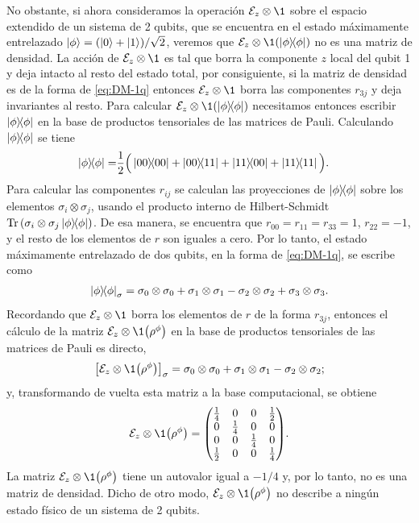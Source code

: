 No obstante, si ahora consideramos la operación $\E_z\otimes\1$ sobre el espacio extendido
de  un sistema de 2 qubits, que se encuentra en el estado máximamente
entrelazado $\ket{\phi}=\qty(\ket{0}+\ket{1})/\sqrt{2}$, veremos 
que $\E_z\otimes\1\qty(\dyad{\phi}{\phi})$  no es una matriz de densidad.
La acción de $\E_z\otimes\1$ es tal que borra la componente
$z$ local del qubit 1 y deja intacto al resto del estado total, por consiguiente,
si la matriz de densidad es de la forma de \eqref{eq:DM-1q} entonces 
$\E_z\otimes\1$ borra las componentes $r_{3j}$ y deja invariantes 
al resto. Para calcular $\E_z\otimes\1\qty(\dyad{\phi}{\phi})$
necesitamos entonces escribir $\dyad{\phi}{\phi}$ en la base
de productos tensoriales de las matrices de Pauli.
Calculando $\dyad{\phi}{\phi}$ se tiene
\begin{align}
\dyad{\phi}{\phi}=& 
\frac{1}{2}
\Big( \dyad{00}{00} + \dyad{00}{11}
+ \dyad{11}{00} + \dyad{11}{11} \Big).
\label{eq:DM-2q-MaxE}
\end{align}
Para calcular las componentes $r_{ij}$ se calculan las
proyecciones de $\dyad{\phi}{\phi}$ sobre
los elementos $\sigma_i\otimes\sigma_j$, usando el producto interno
de Hilbert-Schmidt $\Tr\qty(\pauli{i}{j}\dyad{\phi}{\phi})$.
De esa manera, se encuentra que $r_{00}=r_{11}=r_{33}=1$, $r_{22}=-1$,
y el resto de los elementos de $r$ son iguales a cero. 
Por lo tanto, el estado máximamente entrelazado de
dos qubits, en la forma de \eqref{eq:DM-1q}, se escribe como
\begin{align}
\dyad{\phi}{\phi}_{\sigma}=
\pauli{0}{0}+\pauli{1}{1}-\pauli{2}{2}+\pauli{3}{3}.
\end{align}
Recordando que $\E_z\otimes\1$ borra los elementos de $r$ de la forma
$r_{3j}$, entonces el cálculo de la matriz $\E_z\otimes\1 \qty({\rho}^{\phi})$
en la base de productos tensoriales de las matrices de Pauli es directo,
\begin{align}
\qty[\E_z\otimes\1 \qty({\rho}^{\phi})]_{\sigma}=
\pauli{0}{0}+\pauli{1}{1}-\pauli{2}{2};
\end{align}
y, transformando de vuelta esta matriz a la base computacional,
se obtiene
\begin{align}
\E_z\otimes\1 \qty({\rho}^{\phi})=
\mqty( 
\frac{1}{4} & 0 & 0 & \frac{1}{2} \\
0 & \frac{1}{4} & 0 & 0 \\
0 & 0 & \frac{1}{4} & 0 \\
\frac{1}{2} & 0 & 0 & \frac{1}{4} \\
).
\end{align}
La matriz  $\E_z\otimes\1\qty(\rho^{\phi})$ tiene un 
autovalor igual a $-1/4$ y, por lo tanto, no es una matriz de densidad.  
Dicho de otro modo, $\E_z\otimes\1\qty(\rho^{\phi})$ 
no describe a ningún estado físico de un sistema de 2 qubits.

